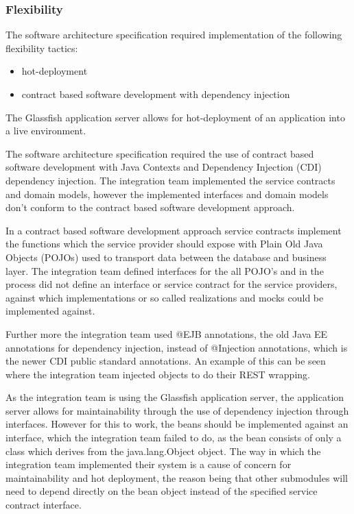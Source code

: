 \documentclass[a4paper,10pt]{article}
\begin{document}
\subsubsection{Flexibility}
The software architecture specification required implementation of the following flexibility tactics:
\begin{itemize}
	\item hot-deployment
	\item contract based software development with dependency injection
\end{itemize}

The Glassfish application server allows for hot-deployment of an application into a live environment.

The software architecture specification required the use of contract based software development with Java Contexts and Dependency Injection (CDI) dependency injection.  The integration team implemented the service contracts and domain models, however the implemented interfaces and domain models don't conform to the contract based software development approach.

In a contract based software development approach service contracts implement the functions which the service provider should expose with Plain Old Java Objects (POJOs) used to transport data between the database and business layer.  The integration team defined interfaces for the all POJO's and in the process did not define an interface or service contract for the service providers, against which implementations or so called realizations and mocks could be implemented against.

Further more the integration team used @EJB annotations, the old Java EE annotations for dependency injection, instead of @Injection annotations, which is the newer CDI public standard annotations. An example of this can be seen where the integration team injected objects to do their REST wrapping.

As the integration team is using the Glassfish application server, the application server allows for maintainability through the use of dependency injection through interfaces.  However for this to work, the beans should be implemented against an interface, which the integration team failed to do, as the bean consists of only a class which derives from the java.lang.Object object. The way in which the integration team implemented their system is a cause of concern for maintainability and hot deployment, the reason being that other submodules will need to depend directly on the bean object instead of the specified service contract interface.
\end{document}
